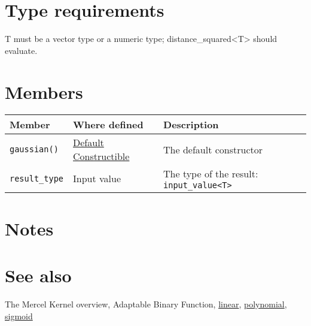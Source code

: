 \documentclass{article}
\begin{document}
\section*{Type requirements}

T must be a vector type or a numeric type; distance_squared<T> should evaluate.


\section*{Members}

\begin{tabular}{lll}
\textbf{Member} & \textbf{Where defined} & \textbf{Description} \\ 
\hline
\texttt{gaussian()} & \href{http://www.sgi.com/tech/stl/DefaultConstructible.html}{Default Constructible} & The default constructor \\
\texttt{result_type} & Input value & The type of the result: \texttt{input_value<T>} \\
\end{tabular}

\section*{Notes}

\section*{See also}

The Mercel Kernel overview, Adaptable Binary Function, 
\href{research/kml/documentation/linear.html}{linear}, 
\href{research/kml/documentation/polynomial.html}{polynomial}, 
\href{research/kml/documentation/sigmoid.html}{sigmoid}



\end{document}
